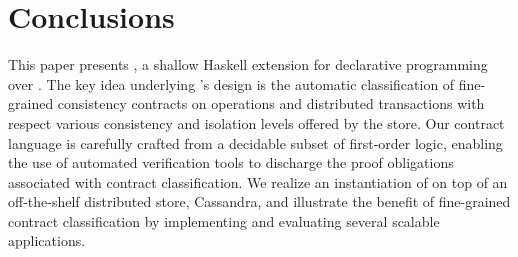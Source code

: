 \section{Conclusions}
\label{sec:concl}

This paper presents \name, a shallow Haskell extension for declarative
programming over \ecds. The key idea underlying \name's design is the automatic
classification of fine-grained consistency contracts on operations and
distributed transactions with respect various consistency and isolation levels
offered by the store. Our contract language is carefully crafted from a
decidable subset of first-order logic, enabling the use of automated
verification tools to discharge the proof obligations associated with contract
classification. We realize an instantiation of \name on top of an off-the-shelf
distributed store, Cassandra, and illustrate the benefit of fine-grained
contract classification by implementing and evaluating several scalable
applications.
